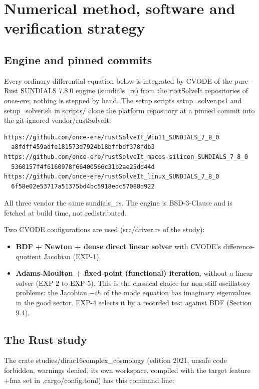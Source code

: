 \documentclass[11pt]{article}
\begin{document}
\section{Numerical method, software and verification strategy}

\subsection{Engine and pinned commits}

Every ordinary differential equation below is integrated by CVODE of the pure-Rust SUNDIALS 7.8.0 engine (sundials\_rs) from the rustSolveIt repositories of once-ere; nothing is stepped by hand. The setup scripts setup\_solver.ps1 and setup\_solver.sh in scripts/ clone the platform repository at a pinned commit into the git-ignored vendor/rustSolveIt:

\begin{Verbatim}[fontsize=\small]
https://github.com/once-ere/rustSolveIt_Win11_SUNDIALS_7_8_0
  a8fdff459adfe181573d7924b18bffbdf378fdb3
https://github.com/once-ere/rustSolveIt_macos-silicon_SUNDIALS_7_8_0
  5360157f4f6160978f66400566c31b2ae25dd44d
https://github.com/once-ere/rustSolveIt_linux_SUNDIALS_7_8_0
  6f58e02e53717a51375bd4bc5918edc57088d922
\end{Verbatim}

All three vendor the same sundials\_rs. The engine is BSD-3-Clause and is fetched at build time, not redistributed.

Two CVODE configurations are used (src/driver.rs of the study):

\begin{itemize}
\item \textbf{BDF + Newton + dense direct linear solver} with CVODE's difference-quotient Jacobian (EXP-1).
\item \textbf{Adams-Moulton + fixed-point (functional) iteration}, without a linear solver (EXP-2 to EXP-5). This is the classical choice for non-stiff oscillatory problems: the Jacobian $-ih$ of the mode equation has imaginary eigenvalues in the good sector. EXP-4 selects it by a recorded test against BDF (Section 9.4).
\end{itemize}

\subsection{The Rust study}

The crate studies/dirac16complex\_cosmology (edition 2021, unsafe code forbidden, warnings denied, its own workspace, compiled with the target feature +fma set in .cargo/config.toml) has this command line:
\end{document}
